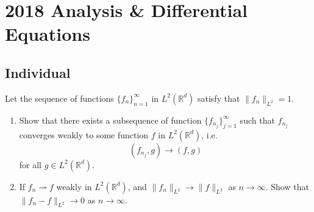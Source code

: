 \section{2018 Analysis \& Differential Equations}

\subsection{Individual}

\begin{exercise}
\label{analysis:2018:1}
Let the sequence of functions $\{f_n\}_{n=1}^{\infty}$ in $L^2(\mathbb{R}^d)$ satisfy that $\|f_n\|_{L^2}=1$.
\begin{enumerate}
    \item Show that there exists a subsequence of function $\{f_{n_j}\}_{j=1}^{\infty}$ such that $f_{n_j}$ converges weakly to some function $f$ in $L^2(\mathbb{R}^d)$, i.e. 
    \[
    (f_{n_j}, g) \to (f,g)
    \]
    for all $g\in L^2(\mathbb{R}^d)$.
    \item If $f_n\rightharpoonup f$ weakly in $L^2(\mathbb{R}^d)$, and $\|f_n\|_{L^2}\to\|f\|_{L^2}$ as $n\to\infty$. Show that $\|f_n-f\|_{L^2}\to 0$ as $n\to\infty$.
\end{enumerate}
\end{exercise}


